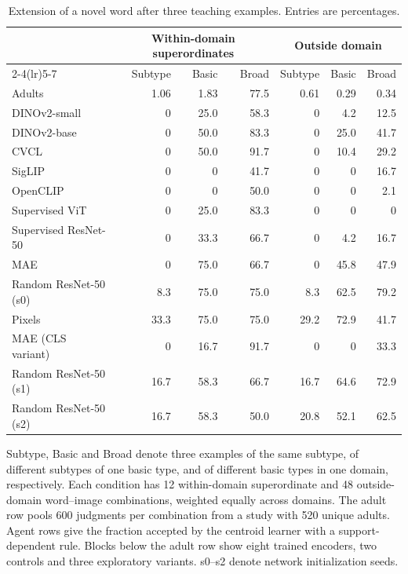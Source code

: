 \begin{table}[t]
\centering
\small
\caption{Extension of a novel word after three teaching examples. Entries are percentages.}
\label{tab:matched-extension}
\begin{tabular}{lrrrrrr}
\toprule
 & \multicolumn{3}{c}{Within-domain superordinates} & \multicolumn{3}{c}{Outside domain} \\
\cmidrule(lr){2-4}\cmidrule(lr){5-7}
 & Subtype & Basic & Broad & Subtype & Basic & Broad \\
\midrule
Adults & 1.06 & 1.83 & 77.5 & 0.61 & 0.29 & 0.34 \\
\midrule
DINOv2-small & 0 & 25.0 & 58.3 & 0 & 4.2 & 12.5 \\
DINOv2-base & 0 & 50.0 & 83.3 & 0 & 25.0 & 41.7 \\
CVCL & 0 & 50.0 & 91.7 & 0 & 10.4 & 29.2 \\
SigLIP & 0 & 0 & 41.7 & 0 & 0 & 16.7 \\
OpenCLIP & 0 & 0 & 50.0 & 0 & 0 & 2.1 \\
Supervised ViT & 0 & 25.0 & 83.3 & 0 & 0 & 0 \\
Supervised ResNet-50 & 0 & 33.3 & 66.7 & 0 & 4.2 & 16.7 \\
MAE & 0 & 75.0 & 66.7 & 0 & 45.8 & 47.9 \\
\midrule
Random ResNet-50 (s0) & 8.3 & 75.0 & 75.0 & 8.3 & 62.5 & 79.2 \\
Pixels & 33.3 & 75.0 & 75.0 & 29.2 & 72.9 & 41.7 \\
\midrule
MAE (CLS variant) & 0 & 16.7 & 91.7 & 0 & 0 & 33.3 \\
Random ResNet-50 (s1) & 16.7 & 58.3 & 66.7 & 16.7 & 64.6 & 72.9 \\
Random ResNet-50 (s2) & 16.7 & 58.3 & 50.0 & 20.8 & 52.1 & 62.5 \\
\bottomrule
\end{tabular}
\par\smallskip
\begin{minipage}{0.96\linewidth}\footnotesize
Subtype, Basic and Broad denote three examples of the same subtype, of different subtypes of one basic type, and of different basic types in one domain, respectively. Each condition has 12 within-domain superordinate and 48 outside-domain word--image combinations, weighted equally across domains. The adult row pools 600 judgments per combination from a study with 520 unique adults. Agent rows give the fraction accepted by the centroid learner with a support-dependent rule. Blocks below the adult row show eight trained encoders, two controls and three exploratory variants. s0--s2 denote network initialization seeds.
\end{minipage}
\end{table}
